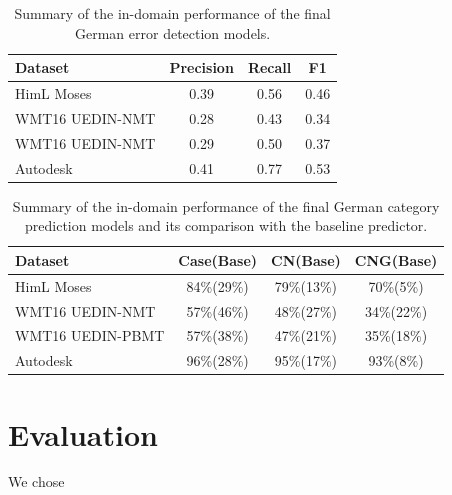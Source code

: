 \begin{table}[t]
\centering
\small

\begin{tabular}{l|ccc}
Dataset  &  Precision  &  Recall  &  F1  \\
\hline
HimL Moses  &  0.39  &  0.56  &  0.46  \\
WMT16 UEDIN-NMT  &  0.28  &  0.43  &  0.34  \\
WMT16 UEDIN-NMT  &  0.29  &  0.50  &  0.37  \\
Autodesk  &  0.41  &  0.77  &  0.53  \\
\end{tabular}
\caption{
    Summary of the in-domain performance of the final German error detection models.
}
\label{wf_de-summary}
\end{table}

\begin{table}[t]
\centering
\small

\begin{tabular}{l|ccc}
Dataset  &  Case(Base)  &  CN(Base)  & CNG(Base)  \\
\hline
HimL Moses  &  84\%(29\%)  &  79\%(13\%)  &  70\%(5\%)  \\
WMT16 UEDIN-NMT  &  57\%(46\%)  &  48\%(27\%)  &  34\%(22\%)  \\
WMT16 UEDIN-PBMT  &  57\%(38\%)  &  47\%(21\%)  &  35\%(18\%)\\
Autodesk  &  96\%(28\%)  &  95\%(17\%)  &  93\%(8\%)  \\

\end{tabular}
\caption{
    Summary of the in-domain performance of the final German category prediction models
	and its comparison with the baseline predictor.
}
\label{cats_de-summary}
\end{table}



\section{Evaluation}

We chose

